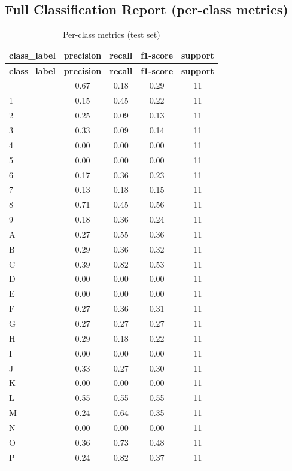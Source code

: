 \documentclass[11pt,a4paper]{article}
\begin{document}
\subsection{Full Classification Report (per-class metrics)}
\small
\begin{longtable}{@{}l c c c c@{}}
\caption{Per-class metrics (test set)}\\
\toprule
\textbf{class\_label} & \textbf{precision} & \textbf{recall} & \textbf{f1-score} & \textbf{support} \\
\midrule
\endfirsthead
\toprule
\textbf{class\_label} & \textbf{precision} & \textbf{recall} & \textbf{f1-score} & \textbf{support} \\
\midrule
\endhead
\bottomrule
\endfoot
0  & 0.67 & 0.18 & 0.29 & 11 \\
1  & 0.15 & 0.45 & 0.22 & 11 \\
2  & 0.25 & 0.09 & 0.13 & 11 \\
3  & 0.33 & 0.09 & 0.14 & 11 \\
4  & 0.00 & 0.00 & 0.00 & 11 \\
5  & 0.00 & 0.00 & 0.00 & 11 \\
6  & 0.17 & 0.36 & 0.23 & 11 \\
7  & 0.13 & 0.18 & 0.15 & 11 \\
8  & 0.71 & 0.45 & 0.56 & 11 \\
9  & 0.18 & 0.36 & 0.24 & 11 \\
A  & 0.27 & 0.55 & 0.36 & 11 \\
B  & 0.29 & 0.36 & 0.32 & 11 \\
C  & 0.39 & 0.82 & 0.53 & 11 \\
D  & 0.00 & 0.00 & 0.00 & 11 \\
E  & 0.00 & 0.00 & 0.00 & 11 \\
F  & 0.27 & 0.36 & 0.31 & 11 \\
G  & 0.27 & 0.27 & 0.27 & 11 \\
H  & 0.29 & 0.18 & 0.22 & 11 \\
I  & 0.00 & 0.00 & 0.00 & 11 \\
J  & 0.33 & 0.27 & 0.30 & 11 \\
K  & 0.00 & 0.00 & 0.00 & 11 \\
L  & 0.55 & 0.55 & 0.55 & 11 \\
M  & 0.24 & 0.64 & 0.35 & 11 \\
N  & 0.00 & 0.00 & 0.00 & 11 \\
O  & 0.36 & 0.73 & 0.48 & 11 \\
P  & 0.24 & 0.82 & 0.37 & 11 \\

\end{longtable}
\end{document}
